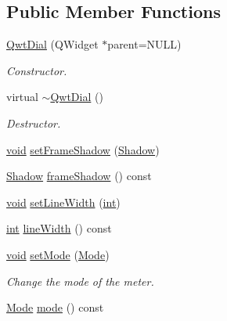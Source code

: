\subsection*{Public Member Functions}
\begin{DoxyCompactItemize}
\item 
\hyperlink{class_qwt_dial_a910ad090ceb51587c965d9a2c9db8f60}{Qwt\-Dial} (Q\-Widget $\ast$parent=N\-U\-L\-L)
\begin{DoxyCompactList}\small\item\em Constructor. \end{DoxyCompactList}\item 
virtual \hyperlink{class_qwt_dial_a16cd1e45a78890c6c5f6e9c07b0180c7}{$\sim$\-Qwt\-Dial} ()
\begin{DoxyCompactList}\small\item\em Destructor. \end{DoxyCompactList}\item 
\hyperlink{group___u_a_v_objects_plugin_ga444cf2ff3f0ecbe028adce838d373f5c}{void} \hyperlink{class_qwt_dial_a272e17e53586a149df4dca437d5f9494}{set\-Frame\-Shadow} (\hyperlink{class_qwt_dial_a7472124cb120352e8538430ab48c2386}{Shadow})
\item 
\hyperlink{class_qwt_dial_a7472124cb120352e8538430ab48c2386}{Shadow} \hyperlink{class_qwt_dial_a49e37bd4da2ed2b846bba75c79a04fbc}{frame\-Shadow} () const 
\item 
\hyperlink{group___u_a_v_objects_plugin_ga444cf2ff3f0ecbe028adce838d373f5c}{void} \hyperlink{class_qwt_dial_a7946ca363a97fd28de4993a5caa54507}{set\-Line\-Width} (\hyperlink{ioapi_8h_a787fa3cf048117ba7123753c1e74fcd6}{int})
\item 
\hyperlink{ioapi_8h_a787fa3cf048117ba7123753c1e74fcd6}{int} \hyperlink{class_qwt_dial_afb583edf70364eb562bf84686b60a9b7}{line\-Width} () const 
\item 
\hyperlink{group___u_a_v_objects_plugin_ga444cf2ff3f0ecbe028adce838d373f5c}{void} \hyperlink{class_qwt_dial_a6b070ba6251fa40bbd876551413c5639}{set\-Mode} (\hyperlink{class_qwt_dial_a7376f53193014b91643350e6e6bc85ad}{Mode})
\begin{DoxyCompactList}\small\item\em Change the mode of the meter. \end{DoxyCompactList}\item 
\hyperlink{class_qwt_dial_a7376f53193014b91643350e6e6bc85ad}{Mode} \hyperlink{class_qwt_dial_afd95a47735c0cfe963dfacd1a6a36a6f}{mode} () const 
\item 

\end{DoxyCompactItemize}
